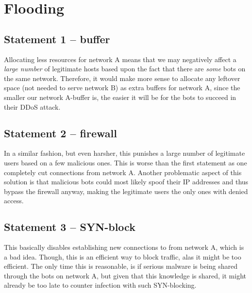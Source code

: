 \documentclass{article}
\begin{document}
\newpage
\section{Flooding}

\subsection*{Statement 1 -- buffer}
Allocating less resources for network A means that we may negatively affect a \textit{large number} of legitimate hosts based upon the fact that there are \textit{some} bots on the same network.
Therefore, it would make more sense to allocate any leftover space (not needed to serve network B) as extra buffers for network A, since the smaller our network A-buffer is, the easier it will be for the bots to succeed in their DDoS attack. %


\subsection*{Statement 2 -- firewall}

In a similar fashion, but even harsher, this punishes a large number of legitimate users based on a few malicious ones.
This is worse than the first statement as one completely cut connections from network A.
Another problematic aspect of this solution is that malicious bots could most likely spoof their IP addresses and thus bypass the firewall anyway, making the legitimate users the only ones with denied access.

\subsection*{Statement 3 -- SYN-block}

This basically disables establishing new connections to from network A, which is a bad idea.
Though, this is an efficient way to block traffic, alas it might be too efficient.
The only time this is reasonable, is if serious malware is being shared through the bots on network A, but given that this knowledge is shared, it might already be too late to counter infection with such SYN-blocking.
\end{document}
